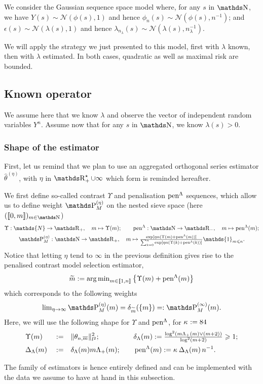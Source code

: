 We consider the Gaussian sequence space model where, for any $s$ in $\N$, we have $Y(s) \sim \mathcal{N}(\phi(s), 1)$ and hence $\phi_{n}(s) \sim \mathcal{N}(\phi(s), n^{-1})$; and $\epsilon(s) \sim \mathcal{N}(\lambda(s), 1)$ and hence $\lambda_{n_{\lambda}}(s) \sim \mathcal{N}(\lambda(s), n_{\lambda}^{-1})$.

We will apply the strategy we just presented to this model, first with $\lambda$ known, then with $\lambda$ estimated.
In both cases, quadratic as well as maximal risk are bounded.

\subsection{Known operator}\label{freq:igssm:kn}
We assume here that we know $\lambda$ and observe the vector of independent random variables $Y^{n}$.
Assume now that for any $s$ in $\N$, we know $\lambda(s) > 0$.
\subsubsection{Shape of the estimator}
First, let us remind that we plan to use an aggregated orthogonal series estimator $\widehat{\theta}^{(\eta)}$, with $\eta$ in $\R_{+}^{\star} \cup \infty$ which form is reminded hereafter.
\begin{de*}
We first define so-called contrast $\Upsilon$ and penalisation $\operatorname{pen}^{\Lambda}$ sequences, which allow us to define weight $\P_{M}^{(\eta)}$ on the nested sieve space (here $(\llbracket 0, m \rrbracket)_{m \in \N}$)
\begin{multline*}
\Upsilon : \mathds{N} \to \R_{+}, \quad m \mapsto \Upsilon(m); \qquad \pen^{\Lambda} : \N \to \R_{-}, \quad m \mapsto \pen^{\Lambda}(m);\\
\P_{M}^{(\eta)} : \N \to \R_{+}, \quad m \mapsto \tfrac{\exp[\eta n (\Upsilon(m) + \pen^{\Lambda}(m))]}{\sum\nolimits_{k = 0}^{n} \exp[\eta n (\Upsilon(k) + \pen^{\Lambda}(k))]} \mathds{1}_{m \leq n}.
\end{multline*}
Notice that letting $\eta$ tend to $\infty$ in the previous definition gives rise to the penalised contrast model selection estimator,
\begin{equation*}
  \widetilde{m}:=\operatorname*{arg\,min}\nolimits_{m\in{\llbracket 1,n\rrbracket }} \big\{\Upsilon(m) + \operatorname{pen}^{\Lambda}(m)\big\}
\end{equation*}
which corresponds to the following weights
\begin{equation*}
  \lim\nolimits_{\rWc\to\infty}\rWe=\dirac[\tDi](\{\Di\})=:\msWe.
\end{equation*}
Here, we will use the following shape for $\Upsilon$ and $\operatorname{pen}^{\Lambda}$, for $\kappa_{} := 84$
\begin{alignat*}{4}
  & \Upsilon(m) && := && \Vert \theta_{n, \overline{m}} \Vert_{l^{2}}^{2};  \quad && \delta_{\Lambda}(m) := \tfrac{\log^{2}(m\Lambda_{+}(m) \vee(m+2))}{\log^{2}(m+2)}\geqslant1;\\
  & \Delta_{\Lambda}(m) && := && \delta_{\Lambda}(m) m \Lambda_{+}(m); \quad && \operatorname{pen}^{\Lambda}(m):= \kappa_{}\,\Delta_{\Lambda}(m)\,n^{-1}.
  \end{alignat*}
  \assEnd
\end{de*}
The family of estimators is hence entirely defined and can be implemented with the data we assume to have at hand in this subsection.

